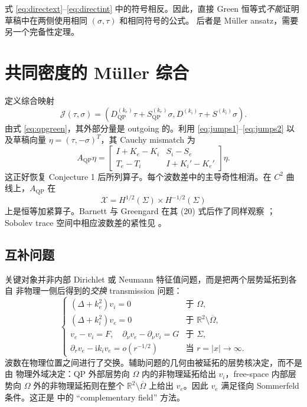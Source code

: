 \documentclass[UTF8,11pt,fontset=fandol]{ctexart}
\newcommand{\Om}{\Omega}
\newcommand{\Sig}{\Sigma}
\newcommand{\R}{\mathbb R}
\newcommand{\ii}{\mathrm i}
\newcommand{\QP}{\mathrm{QP}}
\theoremstyle{plain}
\theoremstyle{definition}
\theoremstyle{remark}
\begin{document}
式 \eqref{eq:directext}--\eqref{eq:directint} 中的符号相反。因此，直接 Green
恒等式\emph{不能}证明草稿中在两侧使用相同 \((\sigma,\tau)\) 和相同符号的公式。
后者是 Müller ansatz，需要另一个完备性定理。

\section{共同密度的 Müller 综合}
\label{sec:muller}

定义综合映射
\begin{equation}
\mathcal J(\tau,\sigma)=
\left(
D_{\QP}^{(k_e)}\tau+S_{\QP}^{(k_e)}\sigma,
D^{(k_i)}\tau+S^{(k_i)}\sigma
\right).
\label{eq:J}
\end{equation}
由式 \eqref{eq:qpgreen}，其外部分量是 outgoing 的。利用
\eqref{eq:jumps1}--\eqref{eq:jumps2} 以及草稿向量
\(\eta=(\tau,-\sigma)^T\)，其 Cauchy mismatch 为
\begin{equation}
A_{\QP}\eta=
\begin{bmatrix}
I+K_e-K_i&S_i-S_e\\
T_e-T_i&I+K_i'-K_e'
\end{bmatrix}\eta.
\label{eq:A}
\end{equation}
这正好恢复 Conjecture 1 后所列算子。每个波数差中的主导奇性相消。在 \(C^2\)
曲线上，\(A_{\QP}\) 在
\begin{equation}
\mathcal X=H^{1/2}(\Sig)\times H^{-1/2}(\Sig)
\label{eq:X}
\end{equation}
上是恒等加紧算子。Barnett 与 Greengard 在其 (20) 式后作了同样观察
\cite[第 3 节]{BarnettGreengard2010}；Sobolev trace 空间中相应波数差的紧性见
\cite[第 4.1 节]{DominguezLyonTurc2016}。

\subsection{互补问题}

关键对象并非内部 Dirichlet 或 Neumann 特征值问题，而是把两个层势延拓到各自
非物理一侧后得到的\emph{交换} transmission 问题：
\begin{equation}
\begin{cases}
(\Delta+k_e^2)v_i=0&\text{于 }\Om,\\
(\Delta+k_i^2)v_e=0&\text{于 }\R^2\setminus\overline\Om,\\
v_e-v_i=F,\quad
\partial_\nu v_e-\partial_\nu v_i=G&\text{于 }\Sig,\\
\displaystyle
\partial_r v_e-\ii k_i v_e=o(r^{-1/2})
&\text{当 }r=|x|\to\infty.
\end{cases}
\label{eq:complement}
\end{equation}
波数在物理位置之间进行了交换。辅助问题的几何由被延拓的层势核决定，而不是由
物理外域决定：QP 外部层势向 \(\Om\) 内的非物理延拓给出 \(v_i\)，free-space
内部层势向 \(\Om\) 外的非物理延拓则在整个
\(\R^2\setminus\overline\Om\) 上给出 \(v_e\)。因此 \(v_e\) 满足径向
Sommerfeld 条件。这正是 \cite[附录 A]{BarnettGreengard2010} 中的
“complementary field” 方法。
\end{document}
